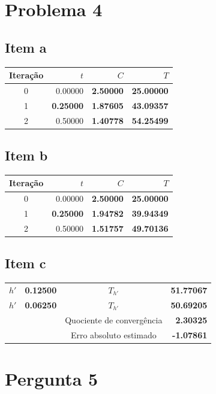 {\section{Problema 4}

\begin{center}
    \begin{minipage}[c]{0.5\textwidth}
        \subsection{Item a}
        \begin{center} \begin{tabular}{c | r | r | r}
            Iteração & $t$ & $C$ & $T$ \\ \hline
            0        & 0.00000 & \textbf{2.50000} & \textbf{25.00000} \\
            1        & \textbf{0.25000} & \textbf{1.87605} & \textbf{43.09357} \\
            2        & 0.50000 & \textbf{1.40778} & \textbf{54.25499}
        \end{tabular} \end{center}
    \end{minipage}%
    \begin{minipage}[c]{0.5\textwidth}
        \subsection{Item b}
        \begin{center} \begin{tabular}{c | r | r | r}
            Iteração & $t$ & $C$ & $T$ \\ \hline
            0        & 0.00000 & \textbf{2.50000} & \textbf{25.00000} \\
            1        & \textbf{0.25000} & \textbf{1.94782} & \textbf{39.94349} \\
            2        & 0.50000 & \textbf{1.51757} & \textbf{49.70136}
        \end{tabular} \end{center}
    \end{minipage}%
\end{center}
\subsection{Item c}
\begin{center} \begin{tabular}{c | r || c | r}
    $h' $ & \textbf{0.12500} & $T_{h' }$ & \textbf{51.77067} \\
    $h' $ & \textbf{0.06250} & $T_{h' }$ & \textbf{50.69205} \\
          &                  & Quociente de convergência & \textbf{2.30325} \\
          &                  & Erro absoluto estimado & \textbf{-1.07861}
\end{tabular} \end{center}

\section{Pergunta 5}

}
